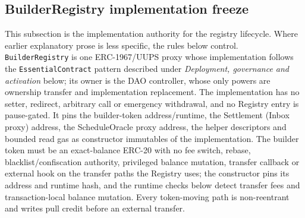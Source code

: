 \documentclass[a4paper,11pt]{article}
\newcommand{\code}[1]{\nolinkurl{#1}}
\begin{document}
\subsection{BuilderRegistry implementation freeze}\label{sec:builder-registry-freeze}

This subsection is the implementation authority for the registry lifecycle.
Where earlier explanatory prose is less specific, the rules below control.
\code{BuilderRegistry} is one ERC-1967/UUPS proxy whose implementation follows
the \code{EssentialContract} pattern described under \emph{Deployment,
governance and activation} below; its owner is the DAO controller, whose only
powers are ownership transfer and implementation replacement.  The
implementation has no setter, redirect, arbitrary call or emergency
withdrawal, and no Registry entry is pause-gated.  It pins the builder-token
address/runtime, the Settlement (Inbox proxy) address, the ScheduleOracle
proxy address, the helper descriptors and bounded read gas as constructor
immutables of the implementation.  The builder token must be an exact-balance
ERC-20 with no fee switch, rebase, blacklist/confiscation authority,
privileged balance mutation, transfer callback or external hook on the
transfer paths the Registry uses; the constructor pins its address and
runtime hash, and the runtime checks below detect transfer fees and
transaction-local balance mutation.  Every token-moving path is
non-reentrant and writes pull credit before an external transfer.
\end{document}
